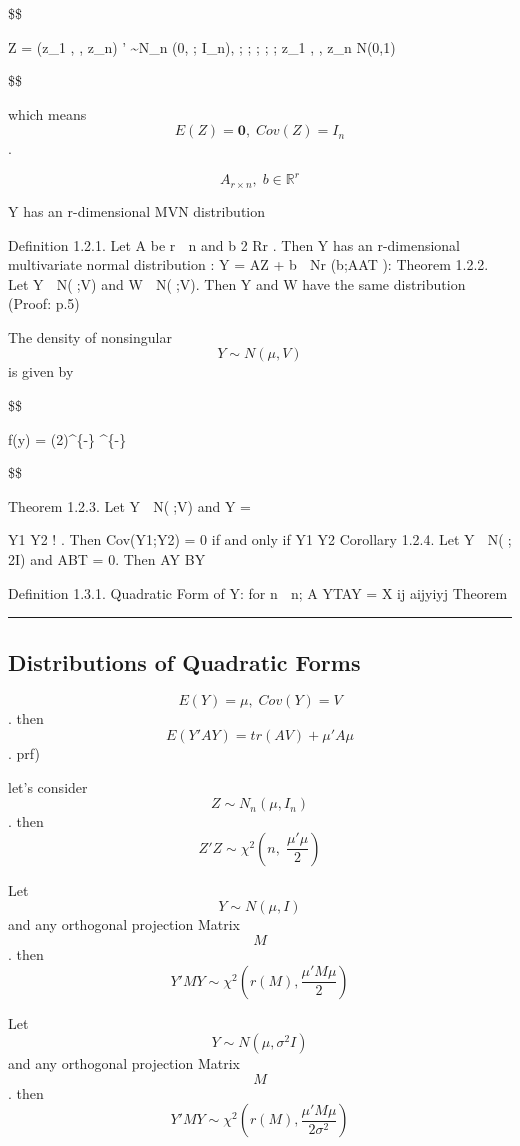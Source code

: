 \documentclass[
]{book}
\begin{document}
{{{\$\$

Z = (z\_1 , \cdots, z\_n) ' \sim N\_n (0, ; I\_n), ; ; ; ; ; z\_1 , \cdots, z\_n  N(0,1)

\$\$

which means \[E(Z)=\pmb 0, \; Cov(Z)=I_n\].

\[
A_{r \times n}, \; b \in \mathbb{R}^r
\]

Y has an r-dimensional MVN distribution

Definition 1.2.1. Let A be r  n and b 2 Rr . Then Y has an
r-dimensional multivariate normal distribution :
Y = AZ + b  Nr (b;AAT ):
Theorem 1.2.2. Let Y  N(;V) and W  N(;V). Then Y
and W have the same distribution (Proof: p.5)

The density of nonsingular \[Y \sim N(\mu,V)\] is given by

\$\$

f(y) = (2\pi)\^{}\{-\} \^{}\{-\} \exp {}

\$\$

Theorem 1.2.3. Let Y  N(;V) and Y =

Y1
Y2
!
. Then
Cov(Y1;Y2) = 0 if and only if Y1 Y2
Corollary 1.2.4. Let Y  N(; 2I) and ABT = 0. Then
AY BY

Definition 1.3.1. Quadratic Form of Y: for n  n; A
YTAY =
X
ij
aijyiyj
Theorem

\begin{center}\rule{0.5\linewidth}{0.5pt}\end{center}

\hypertarget{distributions-of-quadratic-forms}{%
\subsection{Distributions of Quadratic Forms}\label{distributions-of-quadratic-forms}}

\[E(Y) = \mu, \; Cov(Y) = V\]. then \[E(Y'AY) = tr(AV) + \mu ' A \mu\]. prf)

let's consider \[Z \sim N_n (\mu, I_n)\]. then \[ Z'Z \sim \chi^2 \left(n, \; \dfrac{\mu' \mu}{2} \right) \tag{second one is non-centrality parameter}\]

Let \[Y \sim N(\mu , I)\] and any orthogonal projection Matrix \[M\]. then \[Y'MY \sim \chi^2 \left(r(M), \dfrac{\mu ' M \mu}{2} \right)\]

Let \[Y \sim N(\mu , \sigma^2 I)\] and any orthogonal projection Matrix \[M\]. then \[Y'MY \sim \chi^2 \left(r(M), \dfrac{\mu ' M \mu}{2\sigma^2} \right)\]

}}}
\end{document}
